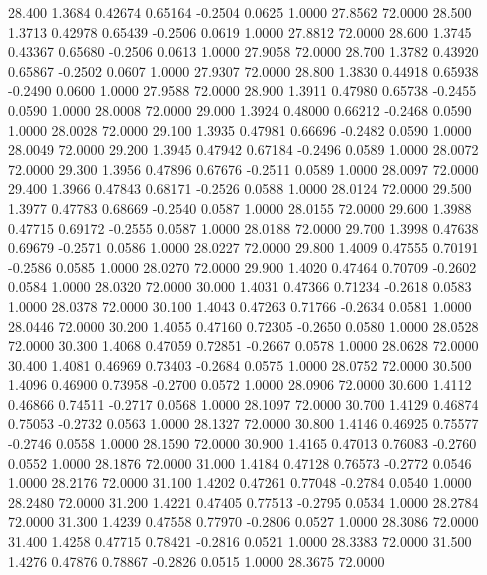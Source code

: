   28.400   1.3684   0.42674   0.65164  -0.2504   0.0625   1.0000  27.8562  72.0000
  28.500   1.3713   0.42978   0.65439  -0.2506   0.0619   1.0000  27.8812  72.0000
  28.600   1.3745   0.43367   0.65680  -0.2506   0.0613   1.0000  27.9058  72.0000
  28.700   1.3782   0.43920   0.65867  -0.2502   0.0607   1.0000  27.9307  72.0000
  28.800   1.3830   0.44918   0.65938  -0.2490   0.0600   1.0000  27.9588  72.0000
  28.900   1.3911   0.47980   0.65738  -0.2455   0.0590   1.0000  28.0008  72.0000
  29.000   1.3924   0.48000   0.66212  -0.2468   0.0590   1.0000  28.0028  72.0000
  29.100   1.3935   0.47981   0.66696  -0.2482   0.0590   1.0000  28.0049  72.0000
  29.200   1.3945   0.47942   0.67184  -0.2496   0.0589   1.0000  28.0072  72.0000
  29.300   1.3956   0.47896   0.67676  -0.2511   0.0589   1.0000  28.0097  72.0000
  29.400   1.3966   0.47843   0.68171  -0.2526   0.0588   1.0000  28.0124  72.0000
  29.500   1.3977   0.47783   0.68669  -0.2540   0.0587   1.0000  28.0155  72.0000
  29.600   1.3988   0.47715   0.69172  -0.2555   0.0587   1.0000  28.0188  72.0000
  29.700   1.3998   0.47638   0.69679  -0.2571   0.0586   1.0000  28.0227  72.0000
  29.800   1.4009   0.47555   0.70191  -0.2586   0.0585   1.0000  28.0270  72.0000
  29.900   1.4020   0.47464   0.70709  -0.2602   0.0584   1.0000  28.0320  72.0000
  30.000   1.4031   0.47366   0.71234  -0.2618   0.0583   1.0000  28.0378  72.0000
  30.100   1.4043   0.47263   0.71766  -0.2634   0.0581   1.0000  28.0446  72.0000
  30.200   1.4055   0.47160   0.72305  -0.2650   0.0580   1.0000  28.0528  72.0000
  30.300   1.4068   0.47059   0.72851  -0.2667   0.0578   1.0000  28.0628  72.0000
  30.400   1.4081   0.46969   0.73403  -0.2684   0.0575   1.0000  28.0752  72.0000
  30.500   1.4096   0.46900   0.73958  -0.2700   0.0572   1.0000  28.0906  72.0000
  30.600   1.4112   0.46866   0.74511  -0.2717   0.0568   1.0000  28.1097  72.0000
  30.700   1.4129   0.46874   0.75053  -0.2732   0.0563   1.0000  28.1327  72.0000
  30.800   1.4146   0.46925   0.75577  -0.2746   0.0558   1.0000  28.1590  72.0000
  30.900   1.4165   0.47013   0.76083  -0.2760   0.0552   1.0000  28.1876  72.0000
  31.000   1.4184   0.47128   0.76573  -0.2772   0.0546   1.0000  28.2176  72.0000
  31.100   1.4202   0.47261   0.77048  -0.2784   0.0540   1.0000  28.2480  72.0000
  31.200   1.4221   0.47405   0.77513  -0.2795   0.0534   1.0000  28.2784  72.0000
  31.300   1.4239   0.47558   0.77970  -0.2806   0.0527   1.0000  28.3086  72.0000
  31.400   1.4258   0.47715   0.78421  -0.2816   0.0521   1.0000  28.3383  72.0000
  31.500   1.4276   0.47876   0.78867  -0.2826   0.0515   1.0000  28.3675  72.0000
